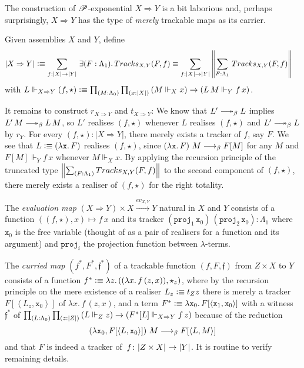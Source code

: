 \documentclass[draft,a4paper,UKenglish,numberwithinsect,cleveref,thm-restate]{lipics-v2021}
\numberwithin{equation}{section}
\theoremstyle{definition}
\theoremstyle{plain}
\begin{document}
The construction of $\PP$-exponential $X \Rightarrow Y$ is a bit laborious and, perhaps surprisingly, $X \Rightarrow Y$ has the type of \emph{merely} trackable maps as its carrier.
\begin{example}[$\PP$-Exponential]
  Given assemblies $X$ and $Y$, define
  \begin{align*}
    \bproj{X \Rightarrow Y} & \defeq \sm{f : |X| \to |Y|} \exis{F : \Lambda_1} \mathsf{Tracks}_{X, Y}(F, f) \equiv \sm{f : |X| \to |Y|} \brck{\sm{F : \Lambda_1} \mathsf{Tracks}_{X, Y}(F, f) }
  \end{align*}
  with $L \Vdash_{X \Rightarrow Y} (f, \star) \defeq \prd{M : \Lambda_0}{x : |X|} \left( M \Vdash_X x\right) \to \left(L\,M \Vdash_Y f\,x\right)$.

  It remains to construct $r_{X\Rightarrow Y}$ and $t_{X \Rightarrow Y}$: 
  We know that $L' \reduce L$ implies $L'\,M \reduce L\,M$, so $L'$ realises $(f, \star)$ whenever $L$ realises $(f, \star)$ and $L' \reduce L$ by $r_Y$.
  For every $(f, \star) : |X \Rightarrow Y|$, there merely exists a tracker of $f$, say $F$.
  We see that $L \vcentcolon\equiv \left(\mathtt{\lambda x}.\,F\right)$ realises $(f, \star)$, since
  $\left(\mathtt{\lambda x}.\,F\right)\,M \longrightarrow_{\beta} F[M]$ for any $M$ and $F[M] \Vdash_Y f\,x$ whenever $M \Vdash_X x$.
  By applying the recursion principle of the truncated type $\brck{\sm{F : \Lambda_1} \mathsf{Tracks}_{X, Y}(F, f) }$ to the second component of $(f, \star)$, there merely exists a realiser of $(f, \star)$ for the right totality.

  The \emph{evaluation map} $(X \Rightarrow Y) \times X \xrightarrow{ev_{X, Y}} Y$ natural in $X$ and $Y$ consists of a function
  $((f, \star) , x) \mapsto f\,x$ and its tracker $(\mathtt{proj}_1\, \mathtt{x}_0)\,(\mathtt{proj}_2\, \mathtt{x}_0) : \Lambda_1$ where $\mathtt{x}_0$ is the free variable (thought of as a pair of realisers for a function and its argument) and $\mathtt{proj}_i$ the projection function between $\lambda$-terms.

  The \emph{curried map} $(f^*, F^*, \mathfrak{f}^*)$ of a trackable function $(f, F, \mathfrak{f})$ from $Z \times X$ to $Y$ consists of
    a function
      $f^* \vcentcolon\equiv \lambda z.\, ((\lambda x.\, f\,(z, x)) , \star_z)$, 
      where by the recursion principle on the mere existence of a realiser $L_z \vcentcolon\equiv t_Z z$ there is merely a tracker~$F[\left< L_z , \mathtt{x}_0 \right>]$ of $\lambda x.\, f\,(z, x)$, and
    a term $F^* \vcentcolon\equiv \lambda \mathtt{x}_0.\, F[ \left< \mathtt{x}_1, \mathtt{x}_0 \right> ]$ with 
    a witness $\mathfrak{f}^*$ of $\prd{L : \Lambda_0}{z : |Z|} \left(L \Vdash_Z z\right) \to \left(F^*[L] \Vdash_{X \Rightarrow Y} f\, z\right)$ because of the reduction
      \[
        \left(\lambda \mathtt{x}_0, F[\left< L , \mathtt{x}_0 \right>]\right)\,M \longrightarrow_{\beta} F[\left< L , M \right>]
      \]
      and that $F$ is indeed a tracker of~$f\colon \mathopen{}\left|Z \times X\right|_{}^{}\mathclose{} \to \mathopen{}\left|Y\right|_{}^{}\mathclose{}$. 
  It is routine to verify remaining details.
\end{example}
\end{document}
